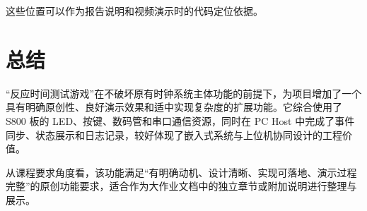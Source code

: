 \documentclass[main.tex]{subfiles}
\begin{document}
这些位置可以作为报告说明和视频演示时的代码定位依据。

\section{总结}

“反应时间测试游戏”在不破坏原有时钟系统主体功能的前提下，为项目增加了一个具有明确原创性、良好演示效果和适中实现复杂度的扩展功能。它综合使用了 S800 板的 LED、按键、数码管和串口通信资源，同时在 PC Host 中完成了事件同步、状态展示和日志记录，较好体现了嵌入式系统与上位机协同设计的工程价值。

从课程要求角度看，该功能满足“有明确动机、设计清晰、实现可落地、演示过程完整”的原创功能要求，适合作为大作业文档中的独立章节或附加说明进行整理与展示。
\end{document}
